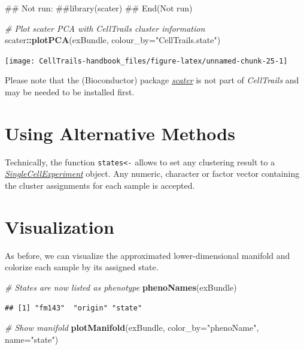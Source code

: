 \documentclass[]{book}
\newenvironment{Shaded}{\begin{snugshade}}{\end{snugshade}}
\newcommand{\KeywordTok}[1]{\textcolor[rgb]{0.13,0.29,0.53}{\textbf{#1}}}
\newcommand{\DataTypeTok}[1]{\textcolor[rgb]{0.13,0.29,0.53}{#1}}
\newcommand{\StringTok}[1]{\textcolor[rgb]{0.31,0.60,0.02}{#1}}
\newcommand{\CommentTok}[1]{\textcolor[rgb]{0.56,0.35,0.01}{\textit{#1}}}
\newcommand{\OperatorTok}[1]{\textcolor[rgb]{0.81,0.36,0.00}{\textbf{#1}}}
\newcommand{\NormalTok}[1]{#1}
\theoremstyle{definition}
\theoremstyle{definition}
\theoremstyle{definition}
\theoremstyle{remark}
\begin{document}
\begin{Shaded}
\begin{Highlighting}[]
\NormalTok{## Not run: }
\NormalTok{##library(scater)}
\NormalTok{## End(Not run)}

\CommentTok{# Plot scater PCA with CellTrails cluster information}
\NormalTok{scater}\OperatorTok{::}\KeywordTok{plotPCA}\NormalTok{(exBundle, }\DataTypeTok{colour_by=}\StringTok{"CellTrails.state"}\NormalTok{)}
\end{Highlighting}
\end{Shaded}

\texttt{[image: CellTrails-handbook\_files/figure-latex/unnamed-chunk-25-1]}

Please note that the (Bioconductor) package
\emph{\href{http://bioconductor.org/packages/scater}{scater}} is not
part of \emph{CellTrails} and may be needed to be installed first.

\section{Using Alternative Methods}\label{using-alternative-methods-2}

Technically, the function \texttt{states\textless{}-} allows to set any
clustering result to a
\emph{\href{http://bioconductor.org/packages/SingleCellExperiment}{SingleCellExperiment}}
object. Any numeric, character or factor vector containing the cluster
assignments for each sample is accepted.

\section{Visualization}\label{visualization-1}

As before, we can visualize the approximated lower-dimensional manifold
and colorize each sample by its assigned state.

\begin{Shaded}
\begin{Highlighting}[]
\CommentTok{# States are now listed as phenotype}
\KeywordTok{phenoNames}\NormalTok{(exBundle)}
\end{Highlighting}
\end{Shaded}

\begin{verbatim}
## [1] "fm143"  "origin" "state"
\end{verbatim}

\begin{Shaded}
\begin{Highlighting}[]
\CommentTok{# Show manifold}
\KeywordTok{plotManifold}\NormalTok{(exBundle, }\DataTypeTok{color_by=}\StringTok{"phenoName"}\NormalTok{, }\DataTypeTok{name=}\StringTok{"state"}\NormalTok{)}
\end{Highlighting}
\end{Shaded}
\end{document}
